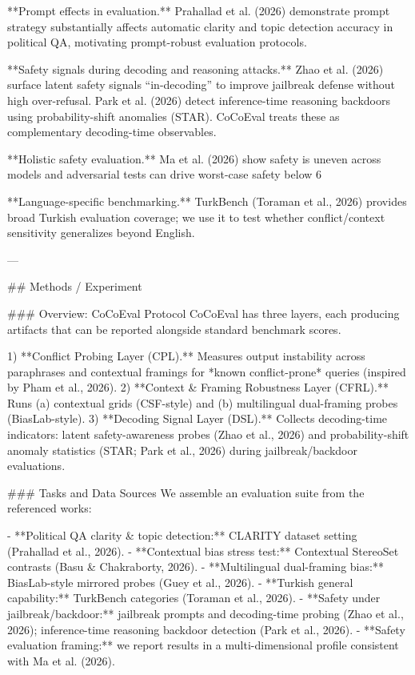 **Prompt effects in evaluation.** Prahallad et al. (2026) demonstrate prompt strategy substantially affects automatic clarity and topic detection accuracy in political QA, motivating prompt-robust evaluation protocols.

**Safety signals during decoding and reasoning attacks.** Zhao et al. (2026) surface latent safety signals “in-decoding” to improve jailbreak defense without high over-refusal. Park et al. (2026) detect inference-time reasoning backdoors using probability-shift anomalies (STAR). CoCoEval treats these as complementary decoding-time observables.

**Holistic safety evaluation.** Ma et al. (2026) show safety is uneven across models and adversarial tests can drive worst-case safety below 6%

**Language-specific benchmarking.** TurkBench (Toraman et al., 2026) provides broad Turkish evaluation coverage; we use it to test whether conflict/context sensitivity generalizes beyond English.

---

## Methods / Experiment  

### Overview: CoCoEval Protocol  
CoCoEval has three layers, each producing artifacts that can be reported alongside standard benchmark scores.

1) **Conflict Probing Layer (CPL).** Measures output instability across paraphrases and contextual framings for *known conflict-prone* queries (inspired by Pham et al., 2026).  
2) **Context & Framing Robustness Layer (CFRL).** Runs (a) contextual grids (CSF-style) and (b) multilingual dual-framing probes (BiasLab-style).  
3) **Decoding Signal Layer (DSL).** Collects decoding-time indicators: latent safety-awareness probes (Zhao et al., 2026) and probability-shift anomaly statistics (STAR; Park et al., 2026) during jailbreak/backdoor evaluations.

### Tasks and Data Sources  
We assemble an evaluation suite from the referenced works:

- **Political QA clarity & topic detection:** CLARITY dataset setting (Prahallad et al., 2026).  
- **Contextual bias stress test:** Contextual StereoSet contrasts (Basu & Chakraborty, 2026).  
- **Multilingual dual-framing bias:** BiasLab-style mirrored probes (Guey et al., 2026).  
- **Turkish general capability:** TurkBench categories (Toraman et al., 2026).  
- **Safety under jailbreak/backdoor:** jailbreak prompts and decoding-time probing (Zhao et al., 2026); inference-time reasoning backdoor detection (Park et al., 2026).  
- **Safety evaluation framing:** we report results in a multi-dimensional profile consistent with Ma et al. (2026).

